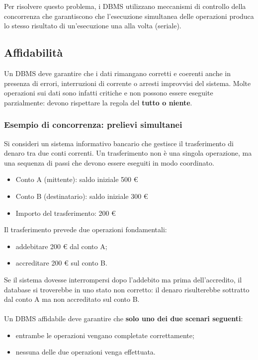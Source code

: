 \documentclass[a4paper,12pt]{article}
\begin{document}
Per risolvere questo problema, i DBMS utilizzano meccanismi di controllo della concorrenza che garantiscono che l’esecuzione simultanea delle operazioni produca lo stesso risultato di un’esecuzione una alla volta (seriale).

\subsection*{Affidabilità}
Un DBMS deve garantire che i dati rimangano corretti e coerenti anche in presenza di errori, interruzioni di corrente o arresti improvvisi del sistema.  
Molte operazioni sui dati sono infatti critiche e non possono essere eseguite parzialmente: devono rispettare la regola del \textbf{tutto o niente}.


\subsubsection*{Esempio di concorrenza: prelievi simultanei}
Si consideri un sistema informativo bancario che gestisce il trasferimento di denaro tra due conti correnti. Un trasferimento non è una singola operazione, ma una sequenza di passi che devono essere eseguiti in modo coordinato.

\bigskip
\begin{itemize}
    \item Conto A (mittente): saldo iniziale 500 €
    \item Conto B (destinatario): saldo iniziale 300 €
    \item Importo del trasferimento: 200 €
\end{itemize}
\bigskip
Il trasferimento prevede due operazioni fondamentali:
\begin{itemize}
    \item addebitare 200 € dal conto A;
    \item accreditare 200 € sul conto B.
\end{itemize}
\bigskip
Se il sistema dovesse interrompersi dopo l’addebito ma prima dell’accredito, il database si troverebbe in uno stato non corretto: il denaro risulterebbe sottratto dal conto A ma non accreditato sul conto B.\\\\
Un DBMS affidabile deve garantire che \textbf{solo uno dei due scenari seguenti}:
\begin{itemize}
    \item entrambe le operazioni vengano completate correttamente;
    \item nessuna delle due operazioni venga effettuata.
\end{itemize}
\end{document}
